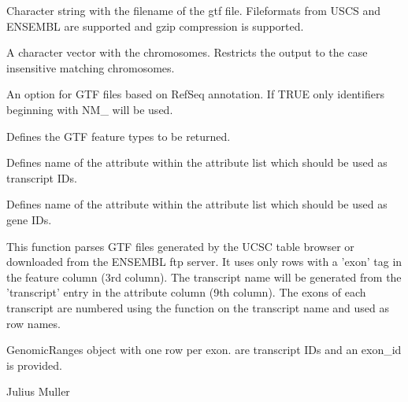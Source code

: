 \documentclass[letterpaper]{book}
\begin{document}
\begin{Arguments}
\begin{ldescription}
\item[\code{gtf\_file}] 
Character string with the filename of the gtf file. Fileformats from USCS and ENSEMBL are supported and gzip compression is supported.

\item[\code{chromosomes}] 
A character vector with the chromosomes. Restricts the output to the case insensitive matching chromosomes.

\item[\code{refseq\_nm}] 
An option for GTF files based on RefSeq annotation. If TRUE only identifiers beginning with NM\_ will be used.

\item[\code{gtf\_feature}] 
Defines the GTF feature types to be returned.

\item[\code{transcript\_id}] 
Defines name of the attribute within the attribute list which should be used as transcript IDs.

\item[\code{gene\_id}] 
Defines name of the attribute within the attribute list which should be used as gene IDs.

\end{ldescription}
\end{Arguments}
%
\begin{Details}
This function parses GTF files generated by the UCSC table browser or downloaded from the ENSEMBL ftp server. It uses only rows with a 'exon' tag in the feature column (3rd column). The transcript name will be generated from the 'transcript' entry in the attribute column (9th column). The exons of each transcript are numbered using the  function on the transcript name and used as row names.
\end{Details}
%
\begin{Value}
GenomicRanges object with one row per exon.  are transcript IDs and an exon\_id is provided.
\end{Value}
%
\begin{Author}
Julius Muller 
\end{Author}
%
\begin{Examples}
\end{Examples}
\end{document}
